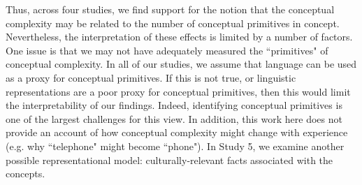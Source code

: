 Thus, across four studies, we find support for the notion that the conceptual complexity may be related to the number of conceptual primitives in concept.   Nevertheless, the interpretation of these effects is limited by a number of factors. One issue is  that we  may not have  adequately measured the ``primitives" of conceptual complexity. In all of our studies, we assume that language can be used as a proxy for conceptual primitives. If this is not true, or linguistic representations are a poor proxy for conceptual primitives, then this would limit the interpretability of our findings. Indeed, identifying  conceptual primitives is one of the largest challenges for this view. In addition, this work here does not provide an account of how conceptual complexity might change with experience (e.g. why ``telephone" might become ``phone").  In Study 5, we examine another possible representational model: culturally-relevant facts associated with the concepts. 


